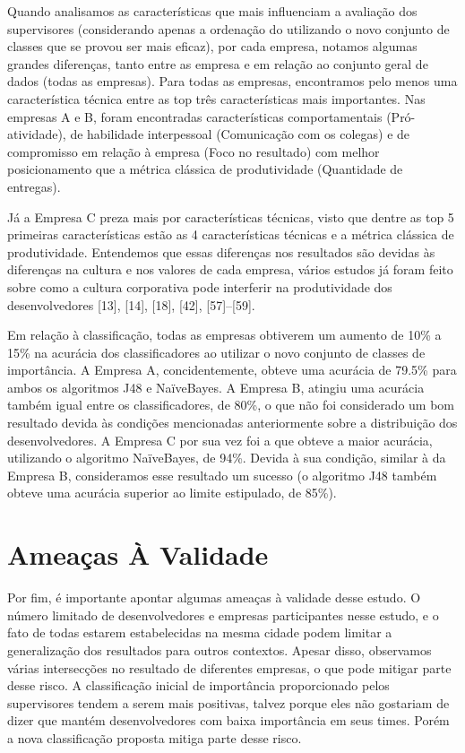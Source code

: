 Quando analisamos as características que mais influenciam a avaliação dos supervisores (considerando apenas a ordenação do utilizando o novo conjunto de classes que se provou ser mais eficaz), por cada empresa, notamos algumas grandes diferenças, tanto entre as empresa e em relação ao conjunto geral de dados (todas as empresas). Para todas as empresas, encontramos pelo menos uma característica técnica entre as top três características mais importantes. Nas empresas A e B, foram encontradas características comportamentais (Pró-atividade), de habilidade interpessoal (Comunicação com os colegas) e de compromisso em relação à empresa (Foco no resultado) com melhor posicionamento que a métrica clássica de produtividade (Quantidade de entregas).

Já a Empresa C preza mais por características técnicas, visto que dentre as top 5 primeiras características estão as 4 características técnicas e a métrica clássica de produtividade. Entendemos que essas diferenças nos resultados são devidas às diferenças na cultura e nos valores de cada empresa, vários estudos já foram feito sobre como a cultura corporativa pode interferir na produtividade dos desenvolvedores [13], [14], [18], [42], [57]–[59].

Em relação à classificação, todas as empresas obtiverem um aumento de 10\% a 15\% na acurácia dos classificadores ao utilizar o novo conjunto de classes de importância. A Empresa A, concidentemente, obteve uma acurácia de 79.5\% para ambos os algoritmos J48 e NaïveBayes. A Empresa B, atingiu uma acurácia também igual entre os classificadores, de 80\%, o que não foi considerado um bom resultado devida às condições mencionadas anteriormente sobre a distribuição dos desenvolvedores. A Empresa C por sua vez foi a que obteve a maior acurácia, utilizando o algoritmo NaïveBayes, de 94\%. Devida à sua condição, similar à da Empresa B, consideramos esse resultado um sucesso (o algoritmo J48 também obteve uma acurácia superior ao limite estipulado, de 85\%).

\section{Ameaças À Validade}

Por fim, é importante apontar algumas ameaças à validade desse estudo. O número limitado de desenvolvedores e empresas participantes nesse estudo, e o fato de todas estarem estabelecidas na mesma cidade podem limitar a generalização dos resultados para outros contextos. Apesar disso, observamos várias intersecções no resultado de diferentes empresas, o que pode mitigar parte desse risco. A classificação inicial de importância proporcionado pelos supervisores tendem a serem mais positivas, talvez porque eles não gostariam de dizer que mantém desenvolvedores com baixa importância em seus times. Porém a nova classificação proposta mitiga parte desse risco.

